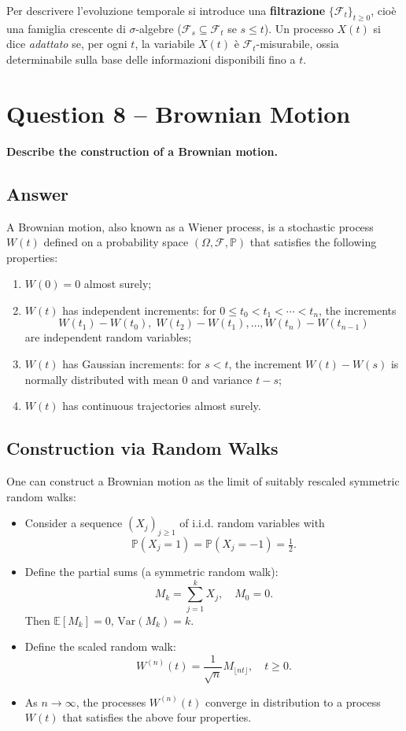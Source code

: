 \documentclass[12pt,a4paper]{book}
\theoremstyle{remark}
\newcommand{\PP}{\mathbb{P}}          %
\newcommand{\EE}{\mathbb{E}}          %
\newcommand{\F}{\mathcal{F}}          %
\newcommand{\Var}{\mathrm{Var}}       %
\begin{document}
Per descrivere l’evoluzione temporale si introduce una \textbf{filtrazione} 
$\{\mathcal{F}_t\}_{t \geq 0}$, cioè una famiglia crescente di $\sigma$-algebre
($\mathcal{F}_s \subseteq \mathcal{F}_t$ se $s \le t$). 
Un processo $X(t)$ si dice \emph{adattato} se, per ogni $t$, la variabile $X(t)$ 
è $\mathcal{F}_t$-misurabile, ossia determinabile sulla base delle informazioni disponibili fino a $t$.











\newpage
\section{Question 8 -- Brownian Motion}
\textbf{Describe the construction of a Brownian motion.}

\subsection*{Answer}
A Brownian motion, also known as a Wiener process, is a stochastic process $W(t)$ defined on a probability space $(\Omega, \F, \PP)$ that satisfies the following properties:

\begin{enumerate}[label=\roman*)]
    \item $W(0) = 0$ almost surely;
    \item $W(t)$ has independent increments: for $0 \leq t_0 < t_1 < \cdots < t_n$, the increments 
    \[
        W(t_1) - W(t_0), \; W(t_2) - W(t_1), \ldots, W(t_n) - W(t_{n-1})
    \]
    are independent random variables;
    \item $W(t)$ has Gaussian increments: for $s < t$, the increment $W(t) - W(s)$ is normally distributed with mean $0$ and variance $t-s$;
    \item $W(t)$ has continuous trajectories almost surely.
\end{enumerate}

\subsection*{Construction via Random Walks}
One can construct a Brownian motion as the limit of suitably rescaled symmetric random walks:

\begin{itemize}
    \item Consider a sequence $(X_j)_{j\geq 1}$ of i.i.d. random variables with
    \[
        \PP(X_j = 1) = \PP(X_j = -1) = \tfrac{1}{2}.
    \]
    \item Define the partial sums (a symmetric random walk):
    \[
        M_k = \sum_{j=1}^k X_j, \quad M_0 = 0.
    \]
    Then $\EE[M_k] = 0$, $\Var(M_k) = k$.
    \item Define the scaled random walk:
    \[
        W^{(n)}(t) = \frac{1}{\sqrt{n}} M_{\lfloor nt \rfloor}, \quad t \geq 0.
    \]
    \item As $n \to \infty$, the processes $W^{(n)}(t)$ converge in distribution to a process $W(t)$ that satisfies the above four properties.
\end{itemize}
\end{document}
